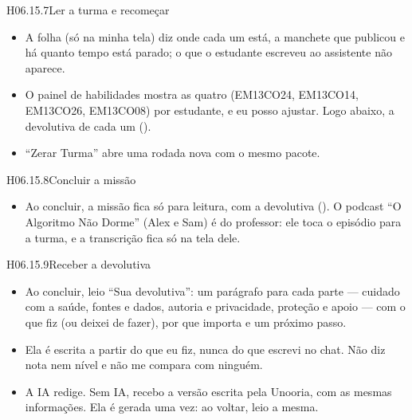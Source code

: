 \begin{historia}{H06.15.7}{Ler a turma e recomeçar}{\pronto}
\aceite
\begin{itemize}
  \item A folha (só na minha tela) diz onde cada um está, a manchete que
    publicou e há quanto tempo está parado; o que o estudante escreveu ao
    assistente não aparece.
  \item O painel de habilidades mostra as quatro (EM13CO24, EM13CO14,
    EM13CO26, EM13CO08) por estudante, e eu posso ajustar. Logo abaixo, a
    devolutiva de cada um ().
  \item \enquote{Zerar Turma} abre uma rodada nova com o mesmo pacote.
\end{itemize}
\end{historia}

\begin{historia}{H06.15.8}{Concluir a missão}{\pronto}
\aceite
\begin{itemize}
  \item Ao concluir, a missão fica só para leitura, com a devolutiva
    (). O podcast \enquote{O Algoritmo Não Dorme} (Alex e Sam) é
    do professor: ele toca o episódio para a turma, e a transcrição fica só na
    tela dele.
\end{itemize}
\end{historia}

\begin{historia}{H06.15.9}{Receber a devolutiva}{\pronto}
\aceite
\begin{itemize}
  \item Ao concluir, leio \enquote{Sua devolutiva}: um parágrafo para cada
    parte --- cuidado com a saúde, fontes e dados, autoria e privacidade,
    proteção e apoio --- com o que fiz (ou deixei de fazer), por que importa
    e um próximo passo.
  \item Ela é escrita a partir do que eu fiz, nunca do que escrevi no chat.
    Não diz nota nem nível e não me compara com ninguém.
  \item A IA redige. Sem IA, recebo a versão escrita pela Unooria, com as
    mesmas informações. Ela é gerada uma vez: ao voltar, leio a mesma.
\end{itemize}
\end{historia}

